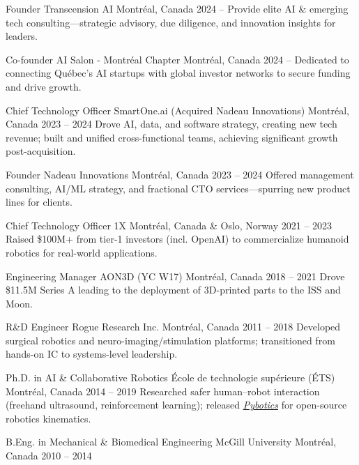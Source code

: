 \documentclass[11pt, letterpaper]{awesome-cv}
\begin{document}
\begin{cventries}

\cventry
{Founder}
{Transcension AI}
{Montréal, Canada}
{2024 --}
{Provide elite AI \& emerging tech consulting—strategic advisory, due diligence, and innovation insights for leaders.}

\cventry
{Co-founder}
{AI Salon - Montréal Chapter}
{Montréal, Canada}
{2024 --}
{Dedicated to connecting Québec’s AI startups with global investor networks to secure funding and drive growth.}

\cventry
{Chief Technology Officer}
{SmartOne.ai (Acquired Nadeau Innovations)}
{Montréal, Canada}
{2023 -- 2024}
{Drove AI, data, and software strategy, creating new tech revenue; built and unified cross-functional teams, achieving significant growth post-acquisition.}

\cventry
{Founder}
{Nadeau Innovations}
{Montréal, Canada}
{2023 -- 2024}
{Offered management consulting, AI/ML strategy, and fractional CTO services—spurring new product lines for clients.}

\cventry
{Chief Technology Officer}
{1X}
{Montréal, Canada \& Oslo, Norway}
{2021 -- 2023}
{Raised \$100M+ from tier-1 investors (incl. OpenAI) to commercialize humanoid robotics for real-world applications.}

\cventry
{Engineering Manager}
{AON3D (YC W17)}
{Montréal, Canada}
{2018 -- 2021}
{Drove \$11.5M Series A leading to the deployment of 3D-printed parts to the ISS and Moon.}

\cventry
{R\&D Engineer}
{Rogue Research Inc.}
{Montréal, Canada}
{2011 -- 2018}
{Developed surgical robotics and neuro-imaging/stimulation platforms; transitioned from hands-on IC to systems-level leadership.}

\end{cventries}

\begin{cventries}

\cventry
{Ph.D. in AI \& Collaborative Robotics}
{École de technologie supérieure (ÉTS)}
{Montréal, Canada}
{2014 -- 2019}
{Researched safer human–robot interaction (freehand ultrasound, reinforcement learning); released \href{https://github.com/EngNadeau/pybotics}{\textit{Pybotics}} for open-source robotics kinematics.}

\cventry
{B.Eng. in Mechanical \& Biomedical Engineering}
{McGill University}
{Montréal, Canada}
{2010 -- 2014}
{}

\end{cventries}
\end{document}
